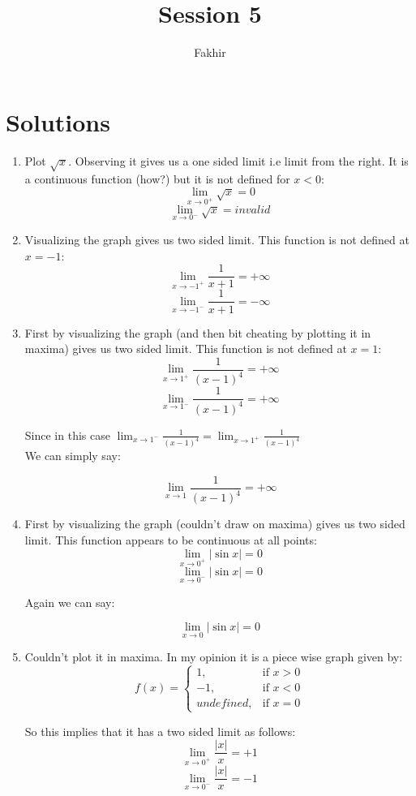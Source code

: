 \documentclass[]{article}
\title{Session 5}
\author{Fakhir}
\begin{document}
\maketitle

\section*{Solutions}

\begin{enumerate}
	\item Plot $\sqrt{x}$. Observing it gives us a one sided limit i.e limit from the right. It is a continuous function (how?) but it is not defined for $x<0$:
	$$\lim_{x\to0^{+}}\sqrt{x} = 0$$
	$$\lim_{x\to0^{-}}\sqrt{x} = invalid$$ 
	
	\item Visualizing the graph gives us two sided limit. This function is not defined at $x=-1$:
	$$\lim_{x\to-1^{+}}\frac{1}{x+1} = +\infty$$
	$$\lim_{x\to-1^{-}}\frac{1}{x+1} = -\infty$$ 
	
	\item First by visualizing the graph (and then bit cheating by plotting it in maxima) gives us two sided limit. This function is not defined at $x=1$:
	$$\lim_{x\to1^{+}}\frac{1}{(x-1)^{4}} = +\infty$$
	$$\lim_{x\to1^{-}}\frac{1}{(x-1)^{4}} = +\infty$$
	
	Since in this case $\lim_{x\to1^{-}}\frac{1}{(x-1)^{4}} = \lim_{x\to1^{+}}\frac{1}{(x-1)^{4}} $ \\
	
	We can simply say:
	
	$$\lim_{x\to1}\frac{1}{(x-1)^{4}} = +\infty$$
	
	\item First by visualizing the graph (couldn't draw on maxima) gives us two sided limit. This function appears to be continuous at all points:
	$$\lim_{x\to0^{+}}|\sin{x}| = 0$$
	$$\lim_{x\to0^{-}}|\sin{x}| = 0$$
	
	Again we can say:
	
	$$\lim_{x\to0}|\sin{x}| = 0$$

	\item Couldn't plot it in maxima. In my opinion it is a piece wise graph given by:
	\[
	f(x)= 
	\begin{cases}
	1, & \text{if } x>0 \\
	-1,& \text{if } x<0 \\
	undefined, & \text{if } x=0
	\end{cases}
	\]
	
	So this implies that it has a two sided limit as follows:
	$$\lim_{x\to0^{+}}\frac{|x|}{x} = +1$$
	$$\lim_{x\to0^{-}}\frac{|x|}{x} = -1$$ \\~\\
	
\end{enumerate}
\end{document}
